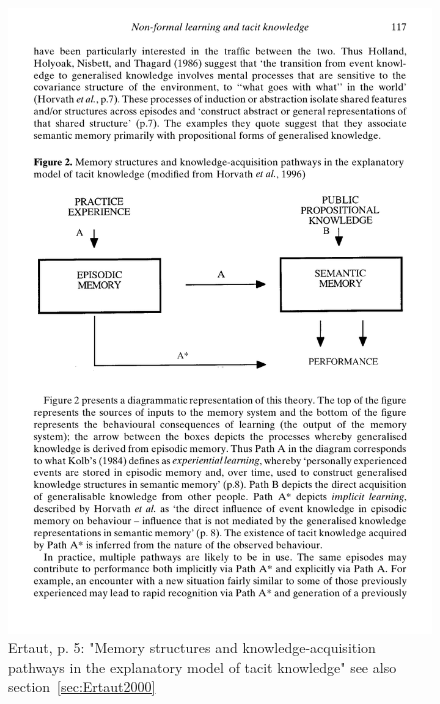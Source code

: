 \documentclass[12pt,a4paper]{article}
\begin{document}
    \begin{figure}[ht]
      \centering
      \includegraphics[width=12cm]{Meeting 4 NON-FORMAL LEARNING - Seite 5.pdf}
      \caption{Ertaut, p. 5: "Memory structures and knowledge-acquisition pathways in the explanatory model of tacit knowledge" see also section~\ref{sec:Ertaut2000}}
      \label{fig:Ertaut tacitknowledgemodel}
    \end{figure}
\end{document}
